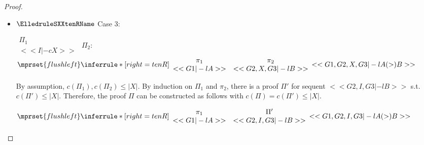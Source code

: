 \begin{proof}
\begin{enumerate}
\begin{itemize}
  \item $\ElledruleSXXtenRName$ Case 3:
      \begin{center}
        \scriptsize
        \begin{math}
          \begin{array}{c}
            \Pi_1 \\
            {<<I |-c X>>}
          \end{array}
        \end{math}
        \qquad\qquad
        $\Pi_2$:
        \begin{math}
          $$\mprset{flushleft}
          \inferrule* [right={\tiny tenR}] {
            {
              \begin{array}{cc}
                \pi_1 & \pi_2 \\
                {<<G1 |-l A>>} & {<<G2, X, G3 |-l B>>}
              \end{array}
            }
          }{<<G1, G2, X, G3 |-l A (>) B>>}
        \end{math}
      \end{center}
      By assumption, $c(\Pi_1),c(\Pi_2)\leq |X|$. By induction on $\Pi_1$ and $\pi_2$, there
      is a proof $\Pi'$ for sequent $<<G2, I, G3 |-l B>>$ s.t. $c(\Pi') \leq |X|$. Therefore,
      the proof $\Pi$ can be constructed as follows with $c(\Pi) = c(\Pi') \leq |X|$.
      \begin{center}
        \scriptsize
        \begin{math}
          $$\mprset{flushleft}
          \inferrule* [right={\tiny tenR}] {
            {
              \begin{array}{cc}
                \pi_1 & \Pi' \\
                {<<G1 |-l A>>} & {<<G2, I, G3 |-l B>>}
              \end{array}
            }
          }{<<G1, G2, I, G3 |-l A (>) B>>}
        \end{math}
      \end{center}


\end{itemize}
\end{enumerate}
\end{proof}
